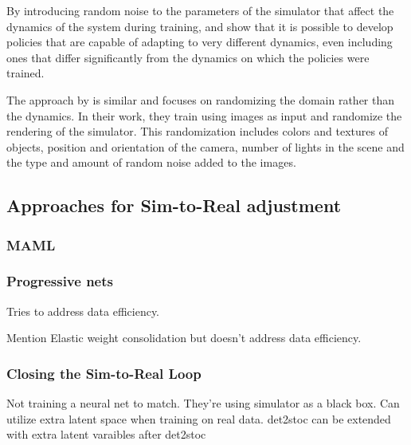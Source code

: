 By introducing random noise to the parameters of the simulator that affect the dynamics of the system during training, \parencite{Antonova2017} and \parencite{peng} show that it is possible to develop policies that are capable of adapting to very different dynamics, even including ones that differ significantly from the dynamics on which the policies were trained.

The approach by \parencite{tobin} is similar and focuses on randomizing the domain rather than the dynamics. In their work, they train using images as input and randomize the rendering of the simulator. This randomization includes colors and textures of objects, position and orientation of the camera, number of lights in the scene and the type and amount of random noise added to the images.

\subsection{Approaches for Sim-to-Real adjustment}
\subsubsection*{MAML}

\subsubsection*{Progressive nets}
Tries to address data efficiency.

Mention Elastic weight consolidation but doesn't address data efficiency.
\subsubsection*{Closing the Sim-to-Real Loop}
Not training a neural net to match. They're using simulator as a black box. Can utilize extra latent space when training on real data. det2stoc can be extended with extra latent varaibles after det2stoc







